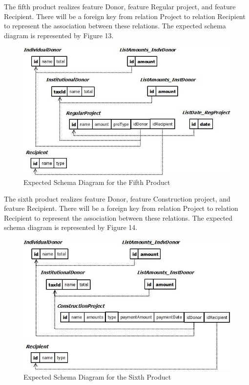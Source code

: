 \documentclass[runningheads,a4paper]{llncs}
\begin{document}
The fifth product realizes feature Donor, feature Regular project, and feature Recipient. There will be a foreign key from relation Project to relation Recipient to represent the association between these relations. The expected schema diagram is represented by Figure 13.

\begin{figure}
	\centering
	\includegraphics[scale=0.7]{db8.jpg}
	\caption{Expected Schema Diagram for the Fifth Product}
	\label{Figure 13}
\end{figure}

The sixth product realizes feature Donor, feature Construction project, and feature Recipient. There will be a foreign key from relation Project to relation Recipient to represent the association between these relations. The expected schema diagram is represented by Figure 14.

\begin{figure}
	\centering
	\includegraphics[scale=0.7]{db9.jpg}
	\caption{Expected Schema Diagram for the Sixth Product}
	\label{Figure 14}
\end{figure}
\end{document}
